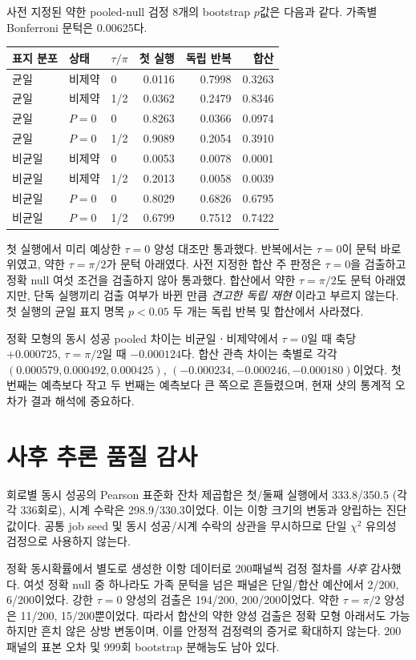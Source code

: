 \documentclass[11pt,a4paper]{article}
\begin{document}
사전 지정된 약한 pooled-null 검정 8개의 bootstrap $p$값은
다음과 같다. 가족별 Bonferroni 문턱은 0.00625다.
\begin{center}
\begin{tabular}{lllrrr}
\toprule
표지 분포 & 상태 & $\tau/\pi$ & 첫 실행 & 독립 반복 & 합산\\
\midrule
균일 & 비제약 & 0   & 0.0116 & 0.7998 & 0.3263\\
균일 & 비제약 & 1/2 & 0.0362 & 0.2479 & 0.8346\\
균일 & $P=0$ & 0   & 0.8263 & 0.0366 & 0.0974\\
균일 & $P=0$ & 1/2 & 0.9089 & 0.2054 & 0.3910\\
비균일 & 비제약 & 0   & 0.0053 & 0.0078 & 0.0001\\
비균일 & 비제약 & 1/2 & 0.2013 & 0.0058 & 0.0039\\
비균일 & $P=0$ & 0   & 0.8029 & 0.6826 & 0.6795\\
비균일 & $P=0$ & 1/2 & 0.6799 & 0.7512 & 0.7422\\
\bottomrule
\end{tabular}
\end{center}
첫 실행에서 미리 예상한 $\tau=0$ 양성 대조만 통과했다.
반복에서는 $\tau=0$이 문턱 바로 위였고, 약한
$\tau=\pi/2$가 문턱 아래였다. 사전 지정한 합산 주 판정은
$\tau=0$을 검출하고 정확 null 여섯 조건을 검출하지 않아
통과했다. 합산에서 약한 $\tau=\pi/2$도 문턱 아래였지만,
단독 실행끼리 검출 여부가 바뀐 만큼 \emph{견고한 독립 재현}
이라고 부르지 않는다. 첫 실행의 균일 표지 명목 $p<0.05$
두 개는 독립 반복 및 합산에서 사라졌다.

정확 모형의 동시 성공 pooled 차이는 비균일ㆍ비제약에서
$\tau=0$일 때 축당 $+0.000725$, $\tau=\pi/2$일 때
$-0.000124$다. 합산 관측 차이는 축별로 각각
$(0.000579,0.000492,0.000425)$,
$(-0.000234,-0.000246,-0.000180)$이었다.
첫 번째는 예측보다 작고 두 번째는 예측보다 큰 쪽으로
흔들렸으며, 현재 샷의 통계적 오차가 결과 해석에 중요하다.

\section{사후 추론 품질 감사}
회로별 동시 성공의 Pearson 표준화 잔차 제곱합은 첫/둘째
실행에서 333.8/350.5 (각각 336회로), 시계 수락은
298.9/330.3이었다. 이는 이항 크기의 변동과 양립하는
진단값이다. 공통 job seed 및 동시 성공/시계 수락의 상관을
무시하므로 단일 $\chi^2$ 유의성 검정으로 사용하지 않는다.

정확 동시확률에서 별도로 생성한 이항 데이터로 200패널씩
검정 절차를 \emph{사후} 감사했다. 여섯 정확 null 중 하나라도
가족 문턱을 넘은 패널은 단일/합산 예산에서 2/200, 6/200이었다.
강한 $\tau=0$ 양성의 검출은 194/200, 200/200이었다.
약한 $\tau=\pi/2$ 양성은 11/200, 15/200뿐이었다.
따라서 합산의 약한 양성 검출은 정확 모형 아래서도
가능하지만 흔치 않은 상방 변동이며, 이를 안정적 검정력의
증거로 확대하지 않는다. 200패널의 표본 오차 및 999회
bootstrap 분해능도 남아 있다.
\end{document}
